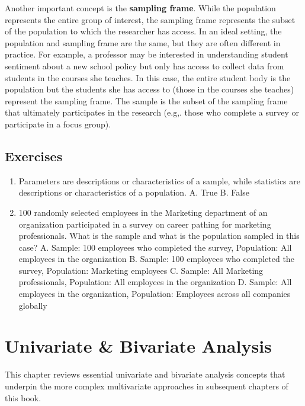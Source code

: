 \documentclass[]{book}
\begin{document}
Another important concept is the \textbf{sampling frame}. While the population represents the entire group of interest, the sampling frame represents the subset of the population to which the researcher has access. In an ideal setting, the population and sampling frame are the same, but they are often different in practice. For example, a professor may be interested in understanding student sentiment about a new school policy but only has access to collect data from students in the courses she teaches. In this case, the entire student body is the population but the students she has access to (those in the courses she teaches) represent the sampling frame. The sample is the subset of the sampling frame that ultimately participates in the research (e.g,. those who complete a survey or participate in a focus group).

\hypertarget{exercises}{%
\section{Exercises}\label{exercises}}

\begin{enumerate}
\def\labelenumi{\arabic{enumi}.}
\item
  Parameters are descriptions or characteristics of a sample, while statistics are descriptions or characteristics of a population.
  A. True
  B. False
\item
  100 randomly selected employees in the Marketing department of an organization participated in a survey on career pathing for marketing professionals. What is the sample and what is the population sampled in this case?
  A. Sample: 100 employees who completed the survey, Population: All employees in the organization
  B. Sample: 100 employees who completed the survey, Population: Marketing employees
  C. Sample: All Marketing professionals, Population: All employees in the organization
  D. Sample: All employees in the organization, Population: Employees across all companies globally
\end{enumerate}

\hypertarget{uni-bi-stats}{%
\chapter{Univariate \& Bivariate Analysis}\label{uni-bi-stats}}

This chapter reviews essential univariate and bivariate analysis concepts that underpin the more complex multivariate approaches in subsequent chapters of this book.
\end{document}
